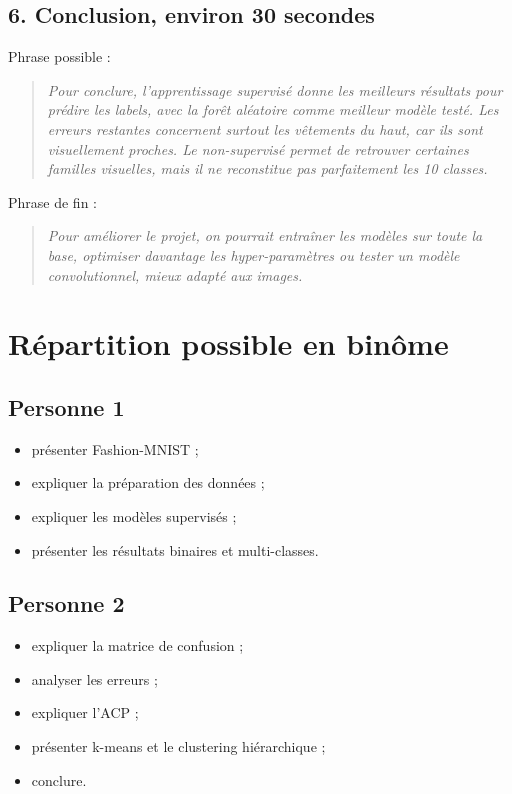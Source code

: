 \documentclass[11pt,a4paper]{article}
\begin{document}
\subsection{6. Conclusion, environ 30 secondes}

Phrase possible :

\begin{quote}
\itshape Pour conclure, l'apprentissage supervisé donne les meilleurs résultats pour prédire les labels, avec la forêt aléatoire comme meilleur modèle testé. Les erreurs restantes concernent surtout les vêtements du haut, car ils sont visuellement proches. Le non-supervisé permet de retrouver certaines familles visuelles, mais il ne reconstitue pas parfaitement les 10 classes.
\end{quote}

Phrase de fin :

\begin{quote}
\itshape Pour améliorer le projet, on pourrait entraîner les modèles sur toute la base, optimiser davantage les hyper-paramètres ou tester un modèle convolutionnel, mieux adapté aux images.
\end{quote}

\section{Répartition possible en binôme}

\subsection{Personne 1}

\begin{itemize}
\item présenter Fashion-MNIST ;
\item expliquer la préparation des données ;
\item expliquer les modèles supervisés ;
\item présenter les résultats binaires et multi-classes.
\end{itemize}

\subsection{Personne 2}

\begin{itemize}
\item expliquer la matrice de confusion ;
\item analyser les erreurs ;
\item expliquer l'ACP ;
\item présenter k-means et le clustering hiérarchique ;
\item conclure.
\end{itemize}
\end{document}
